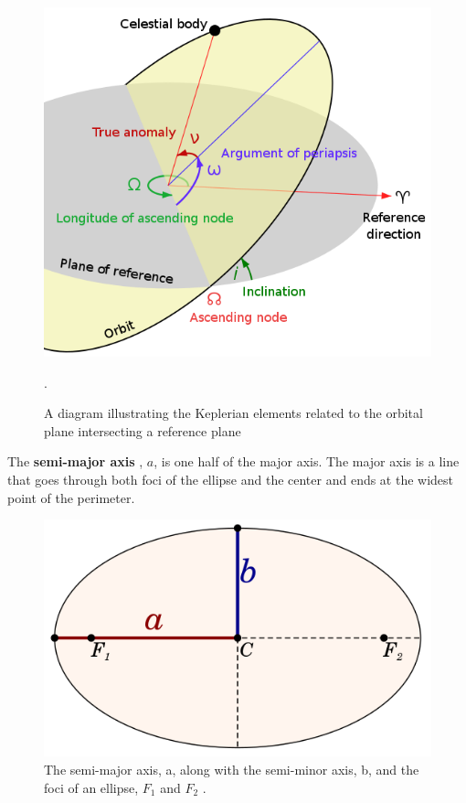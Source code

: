 \documentclass[a4paper, 12pt]{article}
\newcommand{\lindex}[1]{%
	\lowercase{\def\temp{#1}}%
	\expandafter\index\expandafter{\temp}%
}
\newcommand{\boldindex}[1]{%
	\textbf{#1}\lindex{#1}%
}
\begin{document}
\begin{figure}[t]
	\centering
	\includegraphics[scale=0.35]{keplerian-elements}
	\caption{A diagram illustrating the Keplerian elements related to the orbital plane intersecting a reference plane \cite{noauthor_astrodynamicsclassical_nodate}}.
\end{figure}

The \boldindex{semi-major axis}, $a$,  is one half of the major axis. The major axis is a line that goes through both foci of the ellipse and the center and ends at the widest point of the perimeter.

\begin{figure}[h]
	\centering
	\includegraphics[scale=0.35]{semi-major_and_minor_axes}
	\caption{The semi-major axis, a, along with the semi-minor axis, b, and the foci of an ellipse, $F_1$ and $F_2$ \cite{wikipedia_2021}.}
\end{figure}
\end{document}
